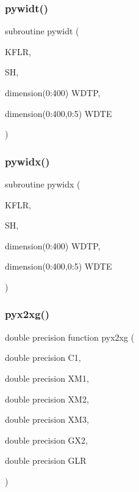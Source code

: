 \subsubsection{\texorpdfstring{pywidt()}{pywidt()}}
{\footnotesize\ttfamily subroutine pywidt (\begin{DoxyParamCaption}\item[{}]{K\+F\+LR,  }\item[{}]{SH,  }\item[{dimension(0\+:400)}]{W\+D\+TP,  }\item[{dimension(0\+:400,0\+:5)}]{W\+D\+TE }\end{DoxyParamCaption})}

\mbox{\label{pythia-6_84_824_8f_a62d5cd78a67f9f9a83ba37293a56e95c}} 
\subsubsection{\texorpdfstring{pywidx()}{pywidx()}}
{\footnotesize\ttfamily subroutine pywidx (\begin{DoxyParamCaption}\item[{}]{K\+F\+LR,  }\item[{}]{SH,  }\item[{dimension(0\+:400)}]{W\+D\+TP,  }\item[{dimension(0\+:400,0\+:5)}]{W\+D\+TE }\end{DoxyParamCaption})}

\mbox{\label{pythia-6_84_824_8f_a628cca4ef6ca74365a47cbb6aec90a5f}} 
\subsubsection{\texorpdfstring{pyx2xg()}{pyx2xg()}}
{\footnotesize\ttfamily double precision function pyx2xg (\begin{DoxyParamCaption}\item[{double precision}]{C1,  }\item[{double precision}]{X\+M1,  }\item[{double precision}]{X\+M2,  }\item[{double precision}]{X\+M3,  }\item[{double precision}]{G\+X2,  }\item[{double precision}]{G\+LR }\end{DoxyParamCaption})}

